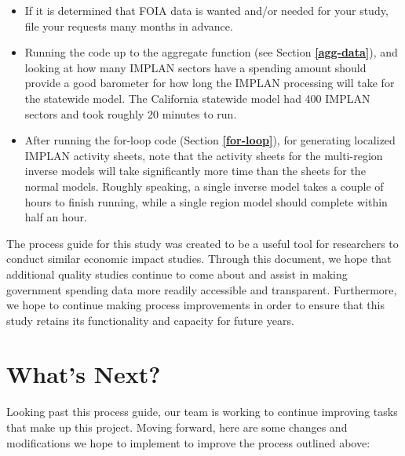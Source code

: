 \documentclass[
]{book}
\providecommand{\tightlist}{%
  \setlength{\itemsep}{0pt}\setlength{\parskip}{0pt}}
\begin{document}
\begin{itemize}
\tightlist
\item
  If it is determined that FOIA data is wanted and/or needed for your study, file your requests many months in advance.
\item
  Running the code up to the aggregate function (see Section \textbf{\ref{agg-data}}), and looking at how many IMPLAN sectors have a spending amount should provide a good barometer for how long the IMPLAN processing will take for the statewide model. The California statewide model had 400 IMPLAN sectors and took roughly 20 minutes to run.
\item
  After running the for-loop code (Section \textbf{\ref{for-loop}}), for generating localized IMPLAN activity sheets, note that the activity sheets for the multi-region inverse models will take significantly more time than the sheets for the normal models. Roughly speaking, a single inverse model takes a couple of hours to finish running, while a single region model should complete within half an hour.
\end{itemize}

The process guide for this study was created to be a useful tool for researchers to conduct similar economic impact studies. Through this document, we hope that additional quality studies continue to come about and assist in making government spending data more readily accessible and transparent. Furthermore, we hope to continue making process improvements in order to ensure that this study retains its functionality and capacity for future years.

\hypertarget{next}{%
\chapter{What's Next?}\label{next}}

Looking past this process guide, our team is working to continue improving tasks that make up this project. Moving forward, here are some changes and modifications we hope to implement to improve the process outlined above:
\end{document}
